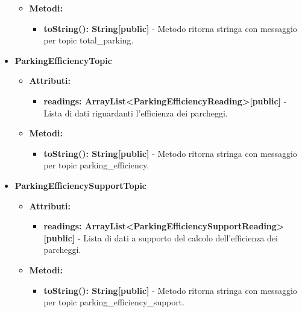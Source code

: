 \documentclass[8pt]{article}
\begin{document}
\begin{itemize}
\begin{itemize}
\begin{itemize}
        \end{itemize}
    \end{itemize}
    \begin{itemize}
        \item \textbf{Metodi:}
        \begin{itemize}
            \item \textbf{toString(): String[public]} - Metodo ritorna stringa con messaggio per topic total\_parking.
        \end{itemize}
    \end{itemize}
    \item \textbf{ParkingEfficiencyTopic}
    \begin{itemize}
        \item \textbf{Attributi:}
        \begin{itemize}
            \item \textbf{readings: ArrayList<ParkingEfficiencyReading>[public]} - Lista di dati riguardanti l'efficienza dei parcheggi.
        \end{itemize}
    \end{itemize}
    \begin{itemize}
        \item \textbf{Metodi:}
        \begin{itemize}
            \item \textbf{toString(): String[public]} - Metodo ritorna stringa con messaggio per topic parking\_efficiency.
        \end{itemize}
    \end{itemize}
    \item \textbf{ParkingEfficiencySupportTopic}
    \begin{itemize}
        \item \textbf{Attributi:}
        \begin{itemize}
            \item \textbf{readings: ArrayList<ParkingEfficiencySupportReading>[public]} - Lista di dati a supporto del calcolo dell'efficienza dei parcheggi.
        \end{itemize}
    \end{itemize}
    \begin{itemize}
        \item \textbf{Metodi:}
        \begin{itemize}
            \item \textbf{toString(): String[public]} - Metodo ritorna stringa con messaggio per topic parking\_efficiency\_support.

\end{itemize}
\end{itemize}
\end{itemize}
\end{document}
